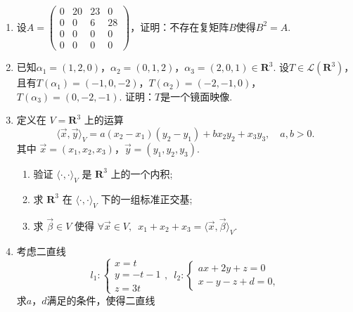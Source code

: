 \begin{enumerate}
    \item 设$A=\begin{pmatrix}
        0 & 20 & 23 & 0 \\ 0 & 0 & 6 & 28 \\ 0 & 0 & 0 & 0 \\ 0 & 0 & 0 & 0
    \end{pmatrix}$，证明：不存在复矩阵$B$使得$B^2=A$.

    \item 已知$\alpha_1=(1,2,0)$，$\alpha_2=(0,1,2)$，$\alpha_3=(2,0,1)\in\mathbf{R}^3$. 设$T\in\mathcal{L}(\mathbf{R}^3)$，且有$T(\alpha_1)=(-1,0,-2)$，$T(\alpha_2)=(-2,-1,0)$，$T(\alpha_3)=(0,-2,-1)$. 证明：$T$是一个镜面映像.

    \item 定义在 $ V = \mathbf{R}^3 $ 上的运算
    \[ \langle \vec{x}, \vec{y} \rangle_V = a(x_2-x_1)(y_2-y_1)+bx_2y_2+x_3y_3, \quad a,b>0. \]
    其中 $ \vec{x} = (x_1, x_2, x_3) $，$ \vec{y} = (y_1, y_2, y_3) $.
    \begin{enumerate}
        \item 验证 $ \langle \cdot, \cdot \rangle_V $ 是 $ \mathbf{R}^3 $ 上的一个内积;

        \item 求 $ \mathbf{R}^3 $ 在 $ \langle \cdot, \cdot \rangle_V $ 下的一组标准正交基;

        \item 求 $ \vec{\beta} \in V $ 使得 $ \forall \vec{x} \in V,\enspace x_1 + x_2 + x_3 = \langle \vec{x}, \vec{\beta} \rangle_V $.
    \end{enumerate}

    \item 考虑二直线
    \[l_1\colon \begin{cases}
        x=t \\ y=-t-1 \\ z=3t
    \end{cases},\enspace l_2\colon \begin{cases}
        ax+2y+z=0 \\ x-y-z+d=0,
    \end{cases}\]
    求$a$，$d$满足的条件，使得二直线

\end{enumerate}

\clearpage
